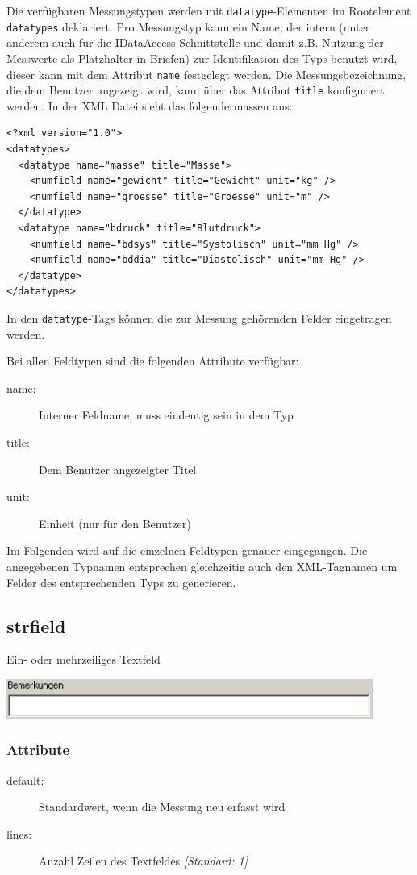 \documentclass[a4paper]{scrartcl}
\begin{document}
Die verfügbaren Messungstypen werden mit \texttt{datatype}-Elementen im
Rootelement \texttt{datatypes} deklariert. Pro Messungstyp kann ein Name, der
intern (unter anderem auch für die IDataAccess-Schnittstelle und damit z.B. Nutzung der Messwerte als Platzhalter in Briefen) zur Identifikation
des Typs benutzt wird, dieser kann mit dem Attribut \texttt{name} festgelegt
werden. Die Messungsbezeichnung, die dem Benutzer angezeigt wird, kann über das
Attribut \texttt{title} konfiguriert werden. In der XML Datei sieht das
folgendermassen aus:
\begin{lstlisting}
<?xml version="1.0">
<datatypes>
  <datatype name="masse" title="Masse">
    <numfield name="gewicht" title="Gewicht" unit="kg" />
    <numfield name="groesse" title="Groesse" unit="m" />
  </datatype>
  <datatype name="bdruck" title="Blutdruck">
    <numfield name="bdsys" title="Systolisch" unit="mm Hg" />
    <numfield name="bddia" title="Diastolisch" unit="mm Hg" />
  </datatype>
</datatypes>
\end{lstlisting}

In den \texttt{datatype}-Tags können die zur Messung gehörenden Felder
eingetragen werden.

Bei allen Feldtypen sind die folgenden Attribute verfügbar:
\begin{description}
    \item[name:] Interner Feldname, muss eindeutig sein in dem Typ
    \item[title:] Dem Benutzer angezeigter Titel
    \item[unit:] Einheit (nur für den Benutzer)
\end{description}

Im Folgenden wird auf die einzelnen Feldtypen genauer eingegangen. Die
angegebenen Typnamen entsprechen gleichzeitig auch den XML-Tagnamen um Felder des
entsprechenden Typs zu generieren.


\subsection{strfield}
Ein- oder mehrzeiliges Textfeld
\begin{center}
    \includegraphics[width=12cm]{images/strfield.png}
\end{center}
\subsubsection{Attribute}
\begin{description}
    \item [default:] Standardwert, wenn die Messung neu erfasst wird
    \item [lines:] Anzahl Zeilen des Textfeldes \textit{[Standard: 1]}
\end{description}
\end{document}
